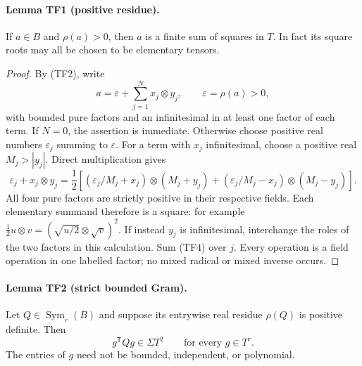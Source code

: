 \documentclass[10pt,a4paper]{article}
\begin{document}
\paragraph{Lemma TF1 (positive residue).}
If $a\in B$ and $\rho(a)>0$, then $a$ is a finite sum of squares in
$T$. In fact its square roots may all be chosen to be elementary
tensors.

\begin{proof}
By (TF2), write
\[
 a=\varepsilon+\sum_{j=1}^N x_j\otimes y_j,\qquad
 \varepsilon=\rho(a)>0,
 \tag{TF3}
\]
with bounded pure factors and an infinitesimal in at least one factor
of each term. If $N=0$, the assertion is immediate. Otherwise choose
positive real numbers $\varepsilon_j$ summing to $\varepsilon$.
For a term with $x_j$ infinitesimal, choose a positive real
$M_j>|y_j|$. Direct multiplication gives
\[
 \varepsilon_j+x_j\otimes y_j
 =\frac12\left[
  (\varepsilon_j/M_j+x_j)\otimes(M_j+y_j)
 +(\varepsilon_j/M_j-x_j)\otimes(M_j-y_j)\right].
 \tag{TF4}
\]
All four pure factors are strictly positive in their respective
fields. Each elementary summand therefore is a square: for example
$\tfrac12u\otimes v=(\sqrt{u/2}\otimes\sqrt v)^2$.
If instead $y_j$ is infinitesimal, interchange the roles of the
two factors in this calculation. Sum (TF4) over $j$. Every operation
is a field operation in one labelled factor; no mixed radical or
mixed inverse occurs.
\end{proof}

\label{p25af2c58da7e:lem:gram}
\paragraph{Lemma TF2 (strict bounded Gram).}
Let $Q\in\operatorname{Sym}_r(B)$ and suppose its entrywise real
residue $\rho(Q)$ is positive definite. Then
\[
                 g^{\mathsf T}Qg\in\Sigma T^2
                 \qquad\text{for every }g\in T^r.
 \tag{TF5}
\]
The entries of $g$ need not be bounded, independent, or polynomial.
\end{document}
